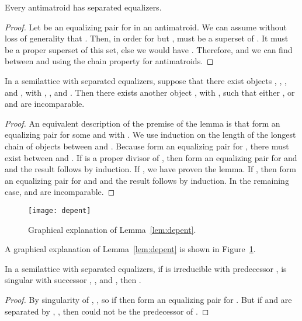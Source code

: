 \documentclass[11pt]{llncs}
\begin{document}
{\begin{lemma}
Every antimatroid has separated equalizers.
\end{lemma}

\begin{proof}
Let  be an equalizing pair for  in an antimatroid. We can assume without loss of generality that . Then, in order for  but ,  must be a superset of . It must be a proper superset of this set, else we would have . Therefore,  and we can find  between  and  using the chain property for antimatroids.
\end{proof}

\begin{lemma}
\label{lem:depent}
In a semilattice with separated equalizers, suppose that there exist objects , , , and , with , , and . Then there exists another object , with , such that either , or   and  are incomparable.
\end{lemma}

\begin{proof}
An equivalent description of the premise of the lemma is that  form an equalizing pair for some  and  with . We use induction on the length of the longest chain of objects between  and . Because  form an equalizing pair for , there must exist  between  and .
If  is a proper divisor of , then  form an equalizing pair for  and  and the result follows by induction.  If , we have proven the lemma. If , then  form an equalizing pair for  and  and the result follows by induction. In the remaining case,  and  are incomparable.
\end{proof}

\begin{figure}[t]
\centering\texttt{[image: depent]}
\caption{Graphical explanation of Lemma~\ref{lem:depent}.}
\label{fig:depent}
\end{figure}

A graphical explanation of Lemma~\ref{lem:depent} is shown in Figure~\ref{fig:depent}.

\begin{lemma}
\label{lem:sing-is-max}
In a semilattice with separated equalizers, if  is irreducible with predecessor ,  is singular with successor , , and , then .
\end{lemma}

\begin{proof}
By singularity of , , so if  then  form an equalizing pair for . But if  and  are separated by , , then  could not be the predecessor of .
\end{proof}

}
\end{document}
